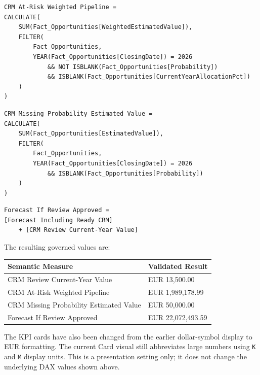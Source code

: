 \documentclass[11pt,a4paper]{article}
\begin{document}
\begin{lstlisting}[style=powerquery]
CRM At-Risk Weighted Pipeline =
CALCULATE(
    SUM(Fact_Opportunities[WeightedEstimatedValue]),
    FILTER(
        Fact_Opportunities,
        YEAR(Fact_Opportunities[ClosingDate]) = 2026
            && NOT ISBLANK(Fact_Opportunities[Probability])
            && ISBLANK(Fact_Opportunities[CurrentYearAllocationPct])
    )
)
\end{lstlisting}

\begin{lstlisting}[style=powerquery]
CRM Missing Probability Estimated Value =
CALCULATE(
    SUM(Fact_Opportunities[EstimatedValue]),
    FILTER(
        Fact_Opportunities,
        YEAR(Fact_Opportunities[ClosingDate]) = 2026
            && ISBLANK(Fact_Opportunities[Probability])
    )
)
\end{lstlisting}

\begin{lstlisting}[style=powerquery]
Forecast If Review Approved =
[Forecast Including Ready CRM]
    + [CRM Review Current-Year Value]
\end{lstlisting}

The resulting governed values are:

\begin{tabularx}{\textwidth}{
    >{\raggedright\arraybackslash}X
    >{\raggedleft\arraybackslash}p{4.2cm}
}

\toprule

Semantic Measure
&
Validated Result
\\

\midrule

CRM Review Current-Year Value
&
EUR 13,500.00
\\

CRM At-Risk Weighted Pipeline
&
EUR 1,989,178.99
\\

CRM Missing Probability Estimated Value
&
EUR 50,000.00
\\

Forecast If Review Approved
&
EUR 22,072,493.59
\\

\bottomrule

\end{tabularx}

The KPI cards have also been changed from the earlier dollar-symbol display to
EUR formatting. The current Card visual still abbreviates large numbers using
\texttt{K} and \texttt{M} display units. This is a presentation setting only;
it does not change the underlying DAX values shown above.
\end{document}
